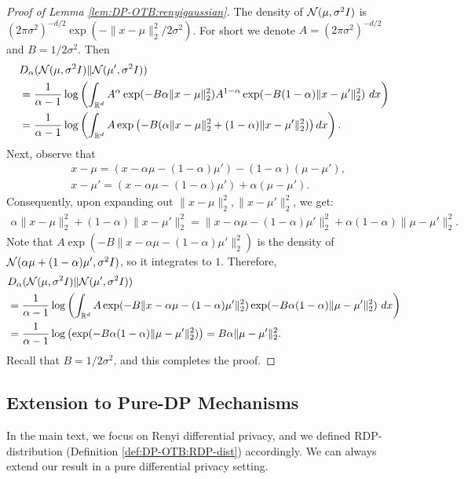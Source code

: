\begin{proof}[Proof of Lemma \ref{lem:DP-OTB:renyigaussian}]
The density of ${\cal N}(\mu,\sigma^2 I)$ is $(2\pi\sigma^2)^{-d/2}\exp(-\|x-\mu\|_2^2/2\sigma^2)$. For short we denote $A=(2\pi\sigma^2)^{-d/2}$ and $B=1/2\sigma^2$. Then
\begin{align*}
    &D_\alpha({\cal N}(\mu,\sigma^2 I)\|{\cal N}(\mu',\sigma^2 I))\\
    &=\frac{1}{\alpha-1}\log\left(\int_{\mathbb R^d} A^\alpha\exp(-B\alpha\|x-\mu\|_2^2) A^{1-\alpha}\exp(-B(1-\alpha)\|x-\mu'\|_2^2)\ dx\right) \\
    &= \frac{1}{\alpha-1}\log \left( \int_{\mathbb R^d} A\exp \left(-B(\alpha\|x-\mu\|_2^2+(1-\alpha)\|x-\mu'\|_2^2) \right) dx \right).
\end{align*}
Next, observe that
\begin{align*}
    & x-\mu= (x - \alpha\mu - (1-\alpha)\mu') -(1-\alpha)(\mu-\mu'), \\
    & x-\mu' = (x-\alpha\mu-(1-\alpha)\mu')+\alpha(\mu-\mu').
\end{align*}
Consequently, upon expanding out $\|x-\mu\|_2^2, \|x-\mu'\|_2^2$, we get:
\begin{align*}
    \alpha\|x-\mu\|_2^2 + (1-\alpha)\|x-\mu'\|_2^2
    = \|x-\alpha\mu-(1-\alpha)\mu'\|_2^2 + \alpha(1-\alpha)\|\mu-\mu'\|_2^2.
\end{align*}
Note that $A\exp(-B\|x-\alpha\mu-(1-\alpha)\mu'\|_2^2)$ is the density of ${\cal N}(\alpha\mu+(1-\alpha)\mu', \sigma^2I)$, so it integrates to $1$. Therefore,
\begin{align*}
    &D_\alpha({\cal N}(\mu,\sigma^2 I)\|{\cal N}(\mu',\sigma^2 I)) \\
    &= \frac{1}{\alpha-1}\log\left( \int_{\mathbb R^d} A\exp(-B\|x-\alpha\mu-(1-\alpha)\mu'\|_2^2) \exp(-B\alpha(1-\alpha)\|\mu-\mu'\|_2^2) \ dx \right) \\
    &= \frac{1}{\alpha-1}\log\left( \exp(-B\alpha(1-\alpha)\|\mu-\mu'\|_2^2) \right)
    = B\alpha\|\mu-\mu'\|_2^2.
\end{align*}
Recall that $B=1/2\sigma^2$, and this completes the proof.
\end{proof}


\subsection{Extension to Pure-DP Mechanisms}

In the main text, we focus on Renyi differential privacy, and we defined RDP-distribution (Definition \ref{def:DP-OTB:RDP-dist}) accordingly. We can always extend our result in a pure differential privacy setting.


